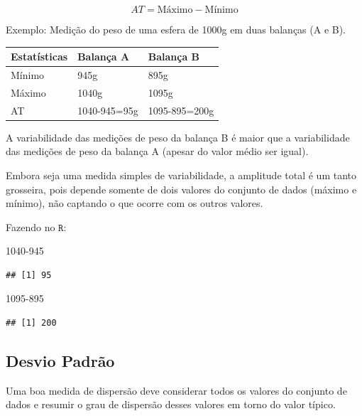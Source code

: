 \documentclass[
]{book}
\newenvironment{Shaded}{\begin{snugshade}}{\end{snugshade}}
\newcommand{\DecValTok}[1]{\textcolor[rgb]{0.00,0.00,0.81}{#1}}
\begin{document}
\begin{equation*}
AT = \text{Máximo}-\text{Mínimo}
\end{equation*}

Exemplo: Medição do peso de uma esfera de 1000g em duas balanças (A e B).

\begin{longtable}[]{@{}lll@{}}
\toprule
Estatísticas & Balança A & Balança B \\
\midrule
\endhead
Mínimo & 945g & 895g \\
Máximo & 1040g & 1095g \\
AT & 1040-945=95g & 1095-895=200g \\
\bottomrule
\end{longtable}

A variabilidade das medições de peso da balança B é maior que a variabilidade das medições de peso da balança A (apesar do valor médio ser igual).

Embora seja uma medida simples de variabilidade, a amplitude total é um tanto grosseira, pois depende somente de dois valores do conjunto de dados (máximo e mínimo), não captando o que ocorre com os outros valores.

Fazendo no \(\texttt{R}\):

\begin{Shaded}
\begin{Highlighting}[]
\DecValTok{1040{-}945}
\end{Highlighting}
\end{Shaded}

\begin{verbatim}
## [1] 95
\end{verbatim}

\begin{Shaded}
\begin{Highlighting}[]
\DecValTok{1095{-}895}
\end{Highlighting}
\end{Shaded}

\begin{verbatim}
## [1] 200
\end{verbatim}

\hypertarget{desvio-padruxe3o}{%
\subsection{Desvio Padrão}\label{desvio-padruxe3o}}

Uma boa medida de dispersão deve considerar todos os valores do conjunto de dados e resumir o grau de dispersão desses valores em torno do valor típico.
\end{document}

